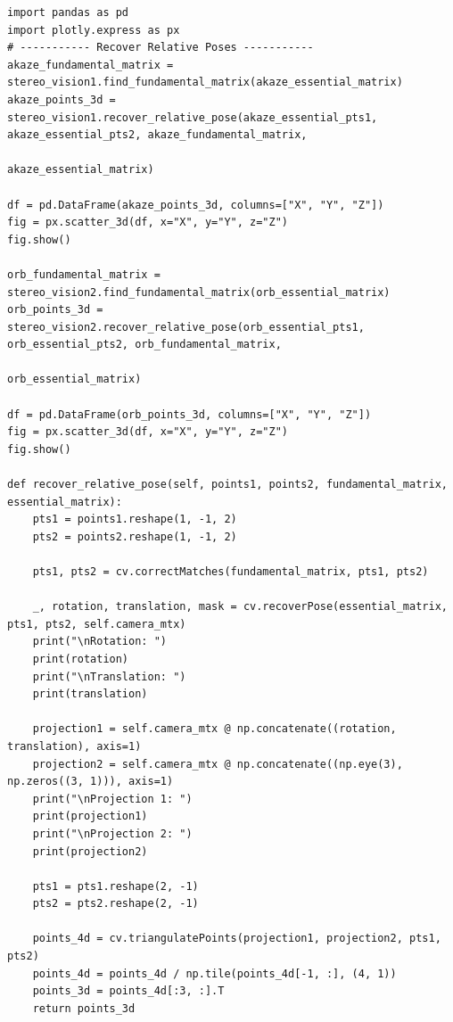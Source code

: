 \documentclass[a4paper, 12pt]{article}
\begin{document}
    \begin{lstlisting}
import pandas as pd
import plotly.express as px
# ----------- Recover Relative Poses -----------
akaze_fundamental_matrix = stereo_vision1.find_fundamental_matrix(akaze_essential_matrix)
akaze_points_3d = stereo_vision1.recover_relative_pose(akaze_essential_pts1,  akaze_essential_pts2, akaze_fundamental_matrix,
                                                    akaze_essential_matrix)

df = pd.DataFrame(akaze_points_3d, columns=["X", "Y", "Z"])
fig = px.scatter_3d(df, x="X", y="Y", z="Z")
fig.show()

orb_fundamental_matrix = stereo_vision2.find_fundamental_matrix(orb_essential_matrix)
orb_points_3d = stereo_vision2.recover_relative_pose(orb_essential_pts1,  orb_essential_pts2, orb_fundamental_matrix,
                                                        orb_essential_matrix)

df = pd.DataFrame(orb_points_3d, columns=["X", "Y", "Z"])
fig = px.scatter_3d(df, x="X", y="Y", z="Z")
fig.show()

def recover_relative_pose(self, points1, points2, fundamental_matrix, essential_matrix):
    pts1 = points1.reshape(1, -1, 2)
    pts2 = points2.reshape(1, -1, 2)

    pts1, pts2 = cv.correctMatches(fundamental_matrix, pts1, pts2)

    _, rotation, translation, mask = cv.recoverPose(essential_matrix, pts1, pts2, self.camera_mtx)
    print("\nRotation: ")
    print(rotation)
    print("\nTranslation: ")
    print(translation)

    projection1 = self.camera_mtx @ np.concatenate((rotation, translation), axis=1)
    projection2 = self.camera_mtx @ np.concatenate((np.eye(3), np.zeros((3, 1))), axis=1)
    print("\nProjection 1: ")
    print(projection1)
    print("\nProjection 2: ")
    print(projection2)

    pts1 = pts1.reshape(2, -1)
    pts2 = pts2.reshape(2, -1)

    points_4d = cv.triangulatePoints(projection1, projection2, pts1, pts2)
    points_4d = points_4d / np.tile(points_4d[-1, :], (4, 1))
    points_3d = points_4d[:3, :].T
    return points_3d
    \end{lstlisting}
\end{document}
